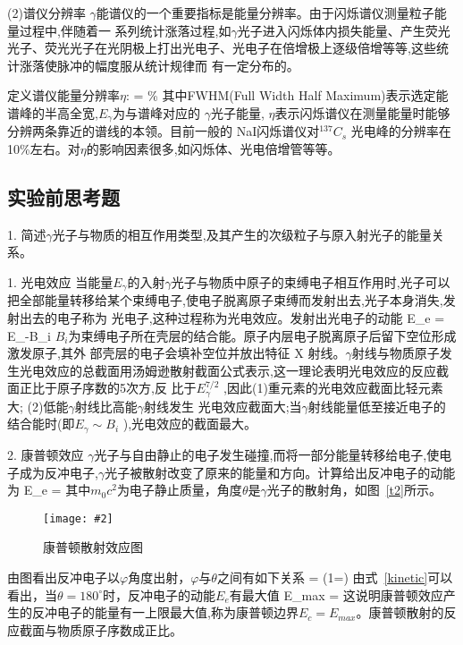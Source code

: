 \documentclass[11pt,a4paper]{ctexart}
\newcommand{\cpic}[2]{
\begin{center}
\texttt{[image: \#2]}
\end{center}
}
\newcommand{\cpicn}[3]
{
\begin{figure}[H]
\cpic{#1}{#2}
\caption{\color{red}#3\label{#2}}
\end{figure}
}
\begin{document}
(2)谱仪分辨率
$\gamma$能谱仪的一个重要指标是能量分辨率。由于闪烁谱仪测量粒子能量过程中,伴随着一
系列统计涨落过程,如$\gamma$光子进入闪烁体内损失能量、产生荧光光子、荧光光子在光阴极上打出光电子、光电子在倍增极上逐级倍增等等,这些统计涨落使脉冲的幅度服从统计规律而
有一定分布的。

定义谱仪能量分辨率$\eta$:
\beq
\eta = \%
\eeq
其中FWHM(Full Width Half Maximum)表示选定能谱峰的半高全宽,$E_\gamma$为与谱峰对应的
$\gamma$光子能量, $\eta$表示闪烁谱仪在测量能量时能够分辨两条靠近的谱线的本领。目前一般的 NaI闪烁谱仪对$^{137}C_s$ 光电峰的分辨率在 10\%左右。对$\eta$的影响因素很多,如闪烁体、光电倍增管等等。

\subsection{实验前思考题}
1. 简述$\gamma$光子与物质的相互作用类型,及其产生的次级粒子与原入射光子的能量关系。

1. 光电效应
当能量$E_{\gamma}$的入射$\gamma$光子与物质中原子的束缚电子相互作用时,光子可以把全部能量转移给某个束缚电子,使电子脱离原子束缚而发射出去,光子本身消失,发射出去的电子称为
光电子,这种过程称为光电效应。发射出光电子的动能
\beq
E_e = E_{\gamma}-B_i
\eeq
$B_i$为束缚电子所在壳层的结合能。原子内层电子脱离原子后留下空位形成激发原子,其外
部壳层的电子会填补空位并放出特征 X 射线。$\gamma$射线与物质原子发生光电效应的总截面用汤姆逊散射截面公式表示,这一理论表明光电效应的反应截面正比于原子序数的5次方,反
比于$E_{\gamma}^{7/2}$ ,因此(1)重元素的光电效应截面比轻元素大;
(2)低能$\gamma$射线比高能$\gamma$射线发生
光电效应截面大;当$\gamma$射线能量低至接近电子的结合能时(即$E_\gamma \sim B_i$ ),光电效应的截面最大。

2. 康普顿效应
$\gamma$光子与自由静止的电子发生碰撞,而将一部分能量转移给电子,使电子成为反冲电子,$\gamma$光子被散射改变了原来的能量和方向。计算给出反冲电子的动能为
\beq\label{kinetic}
E_e = 
\eeq
其中$m_0c^2$为电子静止质量，角度$\theta$是$\gamma$光子的散射角，如图~\ref{t2}所示。
\cpicn{0.6}{t2.png}{康普顿散射效应图}
由图看出反冲电子以$\varphi$角度出射，$\varphi$与$\theta$之间有如下关系
\beq
\cot \varphi = \left(1=\right)\tan{}
\eeq
由式~\ref{kinetic}可以看出，当$\theta = 180^{\circ}$时，反冲电子的动能$E_e$有最大值
\beq
E_{max} = 
\eeq
这说明康普顿效应产生的反冲电子的能量有一上限最大值,称为康普顿边界$E_c = E_{max}$。康普顿散射的反应截面与物质原子序数成正比。
\end{document}
